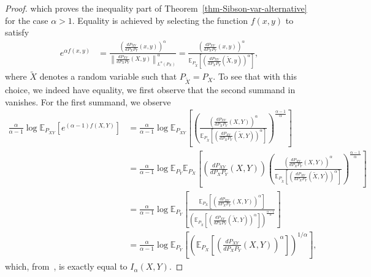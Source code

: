 \documentclass{article}
\numberwithin{theorem}{section}
\numberwithin{example}{section}
\numberwithin{remark}{section}
\numberwithin{definition}{section}
\newcommand{\E}{\mathbb{E}}
\begin{document}
\begin{proof}
which proves the inequality part of Theorem~\ref{thm-Sibson-var-alternative} for the case $\alpha>1.$
Equality is achieved by selecting the function $f(x,y)$ to satisfy
\begin{align}
    e^{\alpha f(x,y)} &=  \frac{\left(\frac{dP_{XY}}{dP_XP_Y}(x,y)\right)^\alpha}{\left\lVert\frac{dP_{XY}}{dP_XP_Y}(X,y)\right\rVert^\alpha _{L^\alpha(P_X)} } = \frac{\left(\frac{dP_{XY}}{dP_XP_Y}(x,y)\right)^\alpha}{\E_{P_{\tilde{X}}}\left[\left(\frac{dP_{XY}}{dP_XP_Y}(\tilde{X},y)\right)^{\alpha}\right] },
\end{align}
where $\tilde{X}$ denotes a random variable such that $P_{\tilde{X}} = P_X.$
To see that with this choice, we indeed have equality, we first observe that the second summand in~ vanishes. For the first summand, we observe
\begin{align}
    \frac{\alpha}{\alpha-1} \log \E_{P_{XY}}[e^{(\alpha-1)f(X,Y)}] &=  \frac{\alpha}{\alpha-1} \log \E_{P_{XY}}\left[\left(\frac{\left(\frac{dP_{XY}}{dP_XP_Y}(X,Y)\right)^\alpha}{\E_{P_{\tilde{X}}}\left[\left(\frac{dP_{XY}}{dP_XP_Y}(\tilde{X},Y)\right)^{\alpha}\right] }\right)^{\frac{\alpha-1}{\alpha}}\right] \\
    &=  \frac{\alpha}{\alpha-1} \log \E_{P_{Y}} \E_{P_X}\left[\left(\frac{dP_{XY}}{dP_XP_Y}(X,Y)\right)\left(\frac{\left(\frac{dP_{XY}}{dP_XP_Y}(X,Y)\right)^\alpha}{\E_{P_{\tilde{X}}}\left[\left(\frac{dP_{XY}}{dP_XP_Y}(\tilde{X},Y)\right)^{\alpha}\right] }\right)^{\frac{\alpha-1}{\alpha}}\right] \\
    &= \frac{\alpha}{\alpha-1} \log \E_{P_{Y}} \left[ \frac{\E_{P_X}\left[\left(\frac{dP_{XY}}{dP_XP_Y}(X,Y)\right)^{\alpha}\right]}{\left(\E_{P_{\tilde{X}}}\left[\left(\frac{dP_{XY}}{dP_XP_Y}(\tilde{X},Y)\right)^{\alpha}\right] \right)^{\frac{\alpha-1}{\alpha}}}\right]\\
    &= \frac{\alpha}{\alpha-1} \log \E_{P_{Y}} \left[ \left( \E_{P_X}\left[\left(\frac{dP_{XY}}{dP_XP_Y}(X,Y)\right)^{\alpha}\right] \right)^{1/\alpha}\right], \label{thm-Sibson-var-alternative-eq-equalityproof}
\end{align}
which, from~, is exactly equal to $I_\alpha(X,Y).$


\end{proof}
\end{document}
